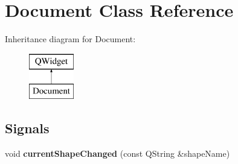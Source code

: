 \hypertarget{class_document}{\section{Document Class Reference}
\label{class_document}
}
Inheritance diagram for Document\-:\begin{figure}[H]
\begin{center}
\leavevmode
\includegraphics[height=2.000000cm]{class_document}
\end{center}
\end{figure}
\subsection*{Signals}
\begin{DoxyCompactItemize}
\item 
\hypertarget{class_document_a67478e963efc5c88a9a9878b4b2dfb4c}{void {\bfseries current\-Shape\-Changed} (const Q\-String \&shape\-Name)}\label{class_document_a67478e963efc5c88a9a9878b4b2dfb4c}

\end{DoxyCompactItemize}
